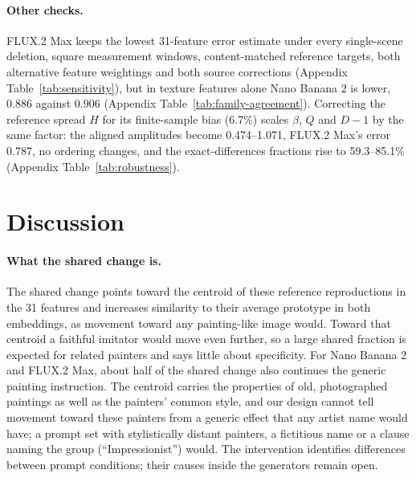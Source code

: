 \documentclass[10pt]{article}
\begin{document}
\paragraph{Other checks.} FLUX.2 Max keeps the lowest 31-feature error estimate under every
single-scene deletion, square measurement windows, content-matched reference targets, both
alternative feature weightings and both source corrections (Appendix Table~\ref{tab:sensitivity}),
but in texture features alone Nano Banana 2 is lower, 0.886 against 0.906 (Appendix
Table~\ref{tab:family-agreement}). Correcting the reference spread $H$ for its finite-sample bias
(6.7\%) scales $\beta$, $Q$ and $D-1$ by the same factor: the aligned amplitudes become
0.474--1.071, FLUX.2 Max's error 0.787, no ordering changes, and the exact-differences fractions
rise to 59.3--85.1\% (Appendix Table~\ref{tab:robustness}).

\section{Discussion}\label{sec:discussion}

\paragraph{What the shared change is.}
The shared change points toward the centroid of these reference reproductions in the 31 features
and increases similarity to their average prototype in both embeddings, as movement toward any
painting-like image would. Toward that centroid a faithful imitator would move even further, so a
large shared fraction is expected for related painters and says little about specificity. For Nano
Banana 2 and FLUX.2 Max, about half of the shared change also continues the generic painting
instruction. The centroid carries the properties of old, photographed paintings as well as the
painters' common style, and our design cannot tell movement toward these painters from a generic
effect that any artist name would have; a prompt set with stylistically distant painters, a
fictitious name or a clause naming the group (``Impressionist'') would. The intervention identifies
differences between prompt conditions; their causes inside the generators remain open.
\end{document}
